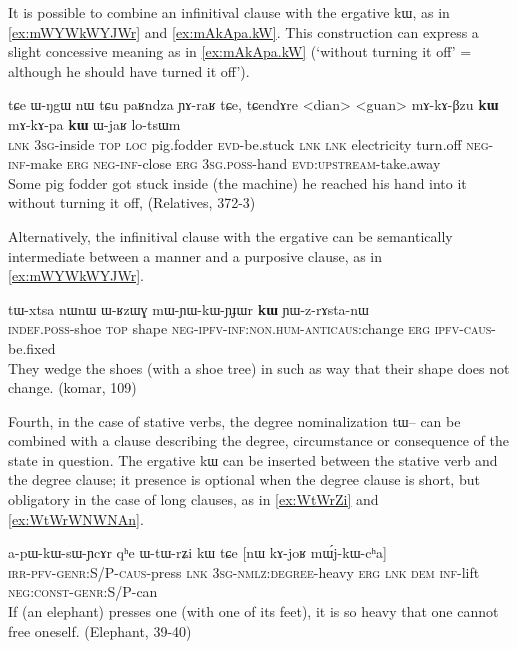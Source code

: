 \documentclass[oldfontcommands,oneside,a4paper,11pt]{article}
\newcommand{\ipa}[1]{{\phon \mbox{#1}}} %
\begin{document}
 


It is possible to combine an infinitival clause with the ergative \ipa{kɯ}, as in  \ref{ex:mWYWkWYJWr} and \ref{ex:mAkApa.kW}.  This construction can express  a slight concessive meaning as in \ref{ex:mAkApa.kW} (`without turning it off' =  although he should have turned it off').

\begin{exe}
\ex \label{ex:mAkApa.kW}
\gll
\ipa{tɕe}   	\ipa{ɯ-ŋgɯ}   	\ipa{nɯ} \ipa{tɕu}   	\ipa{paʁndza}   	\ipa{ɲɤ-raʁ}   	\ipa{tɕe,}   	\ipa{tɕendɤre}   	<dian>   	<guan>   	\ipa{mɤ-kɤ-βzu} 	\ipa{\textbf{kɯ}}   	\ipa{mɤ-kɤ-pa}   	\ipa{\textbf{kɯ}}   	\ipa{ɯ-jaʁ}   	\ipa{lo-tsɯm}   \\
\textsc{lnk} \textsc{3sg}-inside \textsc{top} \textsc{loc} pig.fodder \textsc{evd}-be.stuck \textsc{lnk}
\textsc{lnk} electricity turn.off \textsc{neg-inf}-make \textsc{erg}  \textsc{neg-inf}-close \textsc{erg}  \textsc{3sg.poss}-hand \textsc{evd:upstream}-take.away \\
\glt Some pig fodder got stuck inside (the machine) he reached his hand into it without turning it off, (Relatives, 372-3)
\end{exe} 
 
Alternatively, the infinitival clause with the ergative can be semantically intermediate between a manner and a purposive clause, as in \ref{ex:mWYWkWYJWr}.

\begin{exe}
\ex \label{ex:mWYWkWYJWr}
\gll
\ipa{tɯ-xtsa}   	\ipa{nɯnɯ}   	\ipa{ɯ-ʁzɯɣ}   	\ipa{mɯ-ɲɯ-kɯ-ɲɟɯr}   	\ipa{\textbf{kɯ}}   	\ipa{ɲɯ-z-rɤsta-nɯ}   \\
\textsc{indef.poss}-shoe \textsc{top} shape \textsc{neg-ipfv-inf:non.hum-anticaus}:change \textsc{erg} \textsc{ipfv-caus}-be.fixed \\
\glt They wedge the shoes (with a shoe tree)  in such as way that their shape does not change. (komar, 109)
\end{exe}

Fourth, in the case of stative verbs, the degree nominalization \ipa{tɯ--} can be combined with   a   clause    describing the degree, circumstance or   consequence of the state in question. The ergative \ipa{kɯ} can be   inserted between the stative verb and the degree clause; it presence is optional when the degree clause is short, but obligatory in the case of long clauses, as in \ref{ex:WtWrZi} and \ref{ex:WtWrWNWNAn}.
 

\begin{exe}
\ex \label{ex:WtWrZi}
\gll
\ipa{a-pɯ-kɯ-sɯ-ɲcɤr}         	\ipa{qʰe}         	\ipa{ɯ-tɯ-rʑi}         	\ipa{kɯ}         \ipa{tɕe}         	[\ipa{nɯ}         	\ipa{kɤ-joʁ}         	\ipa{mɯ́j-kɯ-cʰa}]         \\
\textsc{irr-pfv-genr:S/P-caus}-press \textsc{lnk} \textsc{3sg-nmlz:degree}-heavy \textsc{erg} \textsc{lnk} \textsc{dem} \textsc{inf}-lift \textsc{neg:const-genr:S/P}-can \\
\glt If (an elephant) presses one (with one of its feet), it is so heavy that one cannot free oneself. (Elephant, 39-40)
\end{exe}
\end{document}
